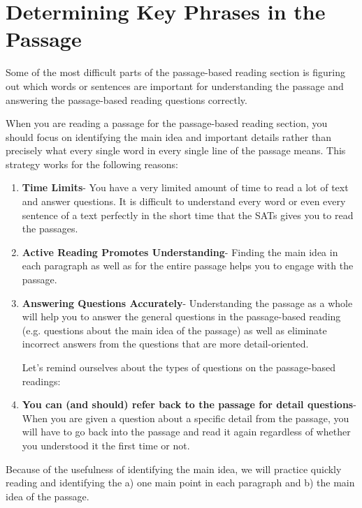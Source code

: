 \section{Determining Key Phrases in the Passage}

Some of the most difficult parts of the passage-based reading section is figuring out which words or
sentences are important for understanding the passage and answering the passage-based reading
questions correctly.

When you are reading a passage for the passage-based reading section, you should focus on identifying the main idea and important details rather than precisely what every single word in every
single line of the passage means. This strategy works for the following reasons:

\begin{enumerate}

\item \textbf{Time Limits}- You have a very limited amount of time to read a lot of text and answer questions. It is difficult to understand every word or even every sentence of a text perfectly in the short time that the SATs gives you to read the passages. 

\item \textbf{Active Reading Promotes Understanding}- Finding the main idea in each paragraph as well as for the entire passage helps you to engage with the passage. 

\item \textbf{Answering Questions Accurately}- Understanding the passage as a whole
will help you to answer the general questions in the passage-based reading (e.g. questions about the main idea of the passage) as well as eliminate
incorrect answers from the questions that are more detail-oriented.

Let's remind ourselves about the types of questions on the passage-based readings:

\item \textbf{You can (and should) refer back to the passage for detail questions}- When you are given a
question about a specific detail from the passage, you will have to go back into the passage and
read it again regardless of whether you understood it the first time or not.

\end{enumerate}

Because of the usefulness of identifying the main idea, we will practice quickly reading and identifying the a) one main point in each paragraph
and b) the main idea of the passage.


